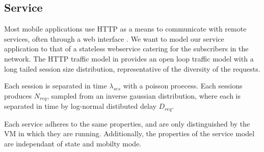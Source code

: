 \subsection{Service}
Most mobile applications use HTTP as a means to communicate with remote services, often through a web interface \cite{maier2010first,falaki2010first}. We want to model our service application to that of a stateless webservice catering for the subscribers in the network. The HTTP traffic model in \cite{liu2001traffic} provides an open loop traffic model with a long tailed session size distribution, representative of the diversity of the requests. 

Each session is separated in time $\lambda_{ses}$ with a poisson proecess. Each sessions produces $N_{req}$, sampled from an inverse gaussian distribution, where each is separated in time by log-normal distibuted delay $D_{req}$.

Each service adheres to the same properties, and are only distinguished by the VM in which they are running. Additionally, the properties of the service model are independant of \ue state and mobilty mode.


